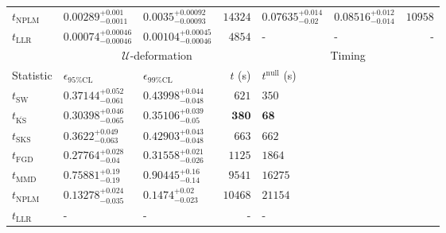 \begin{tabular}{l|llr|llr}
\rowcolor{red!35}	$t_{\mathrm{NPLM}}$ & $0.00289_{-0.0011}^{+0.001}$ & $0.0035_{-0.00093}^{+0.00092}$ & $14324$ & $0.07635_{-0.02}^{+0.014}$ & $0.08516_{-0.014}^{+0.012}$ & $10958$ \\
	$t_{\mathrm{LLR}}$ & $0.00074_{-0.00046}^{+0.00046}$ & $0.00104_{-0.00046}^{+0.00045}$ & $4854$ & - & - & - \\
	\toprule
	\multicolumn{1}{c}{} & \multicolumn{3}{c}{$\mathcal{U}$-deformation} & \multicolumn{3}{c}{Timing} \\
	Statistic & $\epsilon_{95\%\mathrm{CL}}$ & $\epsilon_{99\%\mathrm{CL}}$ & $t$ (s) & $t^{\mathrm{null}}$ (s) \\
	\midrule
	$t_{\mathrm{SW}}$ & $0.37144_{-0.061}^{+0.052}$ & $0.43998_{-0.048}^{+0.044}$ & $621$ & $350$ \\
	$t_{\overline{\mathrm{KS}}}$ & $0.30398_{-0.065}^{+0.046}$ & $0.35106_{-0.05}^{+0.039}$ & ${\mathbf{380}}$ & ${\mathbf{68}}$ \\
	$t_{\mathrm{SKS}}$ & $0.3622_{-0.063}^{+0.049}$ & $0.42903_{-0.048}^{+0.043}$ & $663$ & $662$ \\
	$t_{\mathrm{FGD}}$ & ${\mathbf{0.27764_{-0.04}^{+0.028}}}$ & ${\mathbf{0.31558_{-0.026}^{+0.021}}}$ & $1125$ & $1864$ \\
	$t_{\mathrm{MMD}}$ & $0.75881_{-0.19}^{+0.19}$ & $0.90445_{-0.14}^{+0.16}$ & $9541$ & $16275$ \\
\rowcolor{red!35}	$t_{\mathrm{NPLM}}$ & $0.13278_{-0.035}^{+0.024}$ & $0.1474_{-0.023}^{+0.02}$ & $10468$ & $21154$ \\
	$t_{\mathrm{LLR}}$ & - & - & - & - \\
	\bottomrule
\end{tabular}